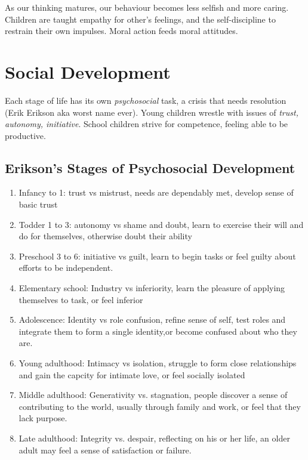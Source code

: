 \documentclass[12pt]{article}
\begin{document}
As our thinking matures, our behaviour becomes less selfish and more caring. Children are taught empathy for other's feelings, and the self-discipline to restrain their own impulses. Moral action feeds moral attitudes.

\section*{Social Development}
Each stage of life has its own \textit{psychosocial} task, a crisis that needs resolution (Erik Erikson aka worst name ever). Young children wrestle with issues of \textit{trust, autonomy, initiative}. School children strive for competence, feeling able to be productive.

\subsection*{Erikson's Stages of Psychosocial Development}
\begin{enumerate}
  \item Infancy to 1: trust vs mistrust, needs are dependably met, develop sense of basic trust
  \item Todder 1 to 3: autonomy vs shame and doubt, learn to exercise their will and do for themselves, otherwise doubt their ability
  \item Preschool 3 to 6: initiative vs guilt, learn to begin tasks or feel guilty about efforts to be independent.
  \item Elementary school: Industry vs inferiority, learn the pleasure of applying themselves to task, or feel inferior
  \item Adolescence: Identity vs role confusion, refine sense of self, test roles and integrate them to form a single identity,or become confused about who they are.
  \item Young adulthood: Intimacy vs isolation, struggle to form close relationships and gain the capcity for intimate love, or feel socially isolated
  \item Middle adulthood: Generativity vs. stagnation, people discover a sense of contributing to the world, usually through family and work, or feel that they lack purpose. 
  \item Late adulthood: Integrity vs. despair, reflecting on his or her life, an older adult may feel a sense of satisfaction or failure. 
\end{enumerate}
\end{document}
